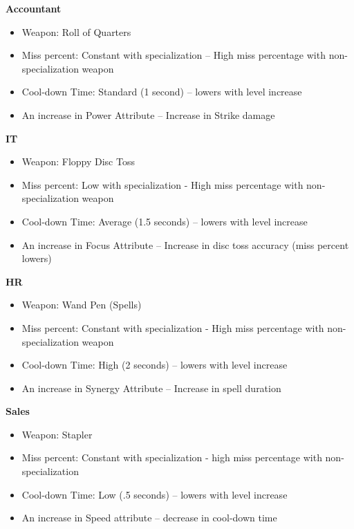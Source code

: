 \documentclass[12pt]{report}
\begin{document}
\textbf{\large{Accountant}}
\begin{itemize}
  \item Weapon: Roll of Quarters
  \item Miss percent: Constant with specialization -- High miss percentage with non-specialization weapon
  \item Cool-down Time: Standard (1 second) -- lowers with level increase %
  \item An increase in Power Attribute -- Increase in Strike damage \\
\end{itemize}

\textbf{\large{IT}} 
\begin{itemize}
  \item Weapon: Floppy Disc Toss
  \item Miss percent: Low with specialization - High miss percentage with non-specialization weapon
  \item Cool-down Time: Average (1.5 seconds) -- lowers with level increase
  \item An increase in Focus Attribute -- Increase in disc toss accuracy (miss percent lowers)\\
\end{itemize}

\textbf{\large{HR}}
\begin{itemize}
  \item Weapon: Wand Pen (Spells)
  \item Miss percent: Constant with specialization - High miss percentage with non-specialization weapon
  \item Cool-down Time: High (2 seconds) -- lowers with level increase
  \item An increase in Synergy Attribute -- Increase in spell duration\\
\end{itemize}

\textbf{\large{Sales}}
\begin{itemize}
  \item Weapon: Stapler
  \item Miss percent: Constant with specialization - high miss percentage with non-specialization 
  \item Cool-down Time: Low (.5 seconds) -- lowers with level increase
  \item An increase in Speed attribute -- decrease in cool-down time
\end{itemize}
\end{document}
